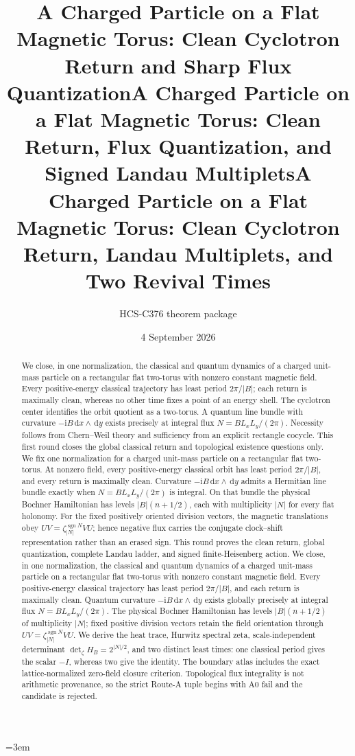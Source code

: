 \documentclass[10pt]{article}
\title{A Charged Particle on a Flat Magnetic Torus:
Clean Cyclotron Return and Sharp Flux Quantization}
\title{A Charged Particle on a Flat Magnetic Torus:
Clean Return, Flux Quantization, and Signed Landau Multiplets}
\title{A Charged Particle on a Flat Magnetic Torus:
Clean Cyclotron Return, Landau Multiplets, and Two Revival Times}
\author{HCS-C376 theorem package}
\date{4 September 2026}
\newcommand{\ii}{\mathrm i}
\newcommand{\dd}{\,\mathrm d}
\newcommand{\sgn}{\operatorname{sgn}}
\begin{document}
\emergencystretch=3em
\maketitle

\begin{abstract}
\ifcase\CRevisionRound
We close, in one normalization, the classical and quantum dynamics of a
charged unit-mass particle on a rectangular flat two-torus with nonzero
constant magnetic field.  Every positive-energy classical trajectory has
least period $2\pi/|B|$; each return is maximally clean, whereas no other
time fixes a point of an energy shell.  The cyclotron center identifies the
orbit quotient as a two-torus.  A quantum line bundle with curvature
$-\ii B\dd x\wedge\dd y$ exists precisely at integral flux
$N=BL_xL_y/(2\pi)$.  Necessity follows from Chern--Weil theory and
sufficiency from an explicit rectangle cocycle.  This first round closes
the global classical return and topological existence questions only.
\or
We fix one normalization for a charged unit-mass particle on a rectangular
flat two-torus.  At nonzero field, every positive-energy classical orbit has
least period $2\pi/|B|$, and every return is maximally clean.  Curvature
$-\ii B\dd x\wedge\dd y$ admits a Hermitian line bundle exactly when
$N=BL_xL_y/(2\pi)$ is integral.  On that bundle the physical Bochner
Hamiltonian has levels $|B|(n+1/2)$, each with multiplicity $|N|$ for every
flat holonomy.  For the fixed positively oriented division vectors, the
magnetic translations obey $UV=\zeta_{|N|}^{\sgn N}VU$; hence negative flux
carries the conjugate clock--shift representation rather than an erased
sign.  This round proves the clean return, global quantization, complete
Landau ladder, and signed finite-Heisenberg action.
\else
We close, in one normalization, the classical and quantum dynamics of a
charged unit-mass particle on a rectangular flat two-torus with nonzero
constant magnetic field.  Every positive-energy classical trajectory has
least period $2\pi/|B|$, and each return is maximally clean.  Quantum
curvature $-\ii B\dd x\wedge\dd y$ exists globally precisely at integral
flux $N=BL_xL_y/(2\pi)$.  The physical Bochner Hamiltonian has levels
$|B|(n+1/2)$ of multiplicity $|N|$; fixed positive division vectors retain
the field orientation through $UV=\zeta_{|N|}^{\sgn N}VU$.  We derive the
heat trace, Hurwitz spectral zeta, scale-independent determinant
$\det_\zeta H_B=2^{|N|/2}$, and two distinct least times: one classical
period gives the scalar $-I$, whereas two give the identity.  The boundary
atlas includes the exact lattice-normalized zero-field closure criterion.
Topological flux integrality is not arithmetic provenance, so the strict
Route-A tuple begins with A0 fail and the candidate is rejected.
\fi
\end{abstract}
\end{document}
